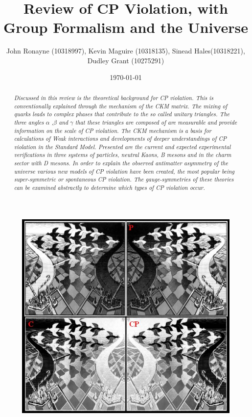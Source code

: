 \documentclass[floatfix,aps,prd,amsmath,amssymb]{revtex4}
\begin{document}
\title{Review of CP Violation, with Group Formalism and the Universe}
\author{John Ronayne (10318997), Kevin Maguire (10318135), Sinead Hales(10318221), Dudley Grant (10275291)}
\date{\today}

\begin{abstract}
\textit{Discussed in this review is the theoretical background for CP violation. This is conventionally explained through the mechanism of the CKM matrix. The mixing of quarks leads to complex phases that contribute to the so called unitary triangles. The three angles $\alpha$ ,$\beta$ and $\gamma$ that these triangles are composed of are measurable and provide information on the scale of CP violation. The CKM mechanism is a basis for calculations of Weak interactions and developments of deeper understandings of CP violation in the Standard Model. Presented are the current and expected experimental verifications in three systems of particles, neutral Kaons, B mesons and in the charm sector with D mesons. In order to explain the observed antimatter asymmetry of the universe various new models of CP violation have been created, the most popular being super-symmetric or spontaneous CP violation. The gauge-symmetries of these theories can be examined abstractly to determine which types of CP violation occur.}
\end{abstract}

\maketitle
{}

\begin{figure}[h!]
\begin{center}
\includegraphics[scale=0.8]{figs/Cover.jpg}
\end{center}
\end{figure}
\end{document}
